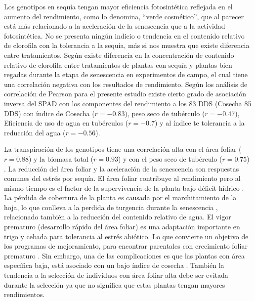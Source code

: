 \documentclass[fleqn,10pt]{Flavio}\usepackage[]{graphicx}\usepackage[]{color}
\begin{document}
Los genotipos en sequ\'ia tengan mayor eficiencia fotosint\'etica reflejada en el aumento del rendimiento, como lo denomina, \citet{Hortensteiner2009} ``verde cosm\'etico'', que al parecer est\'a m\'as relacionado a la aceleraci\'on de la senescencia que a la actividad fotosint\'etica. No se presenta ning\'un indicio o tendencia en el contenido relativo de clorofila con la tolerancia a la sequ\'ia, m\'as si nos muestra que existe diferencia entre tratamientos. Seg\'un \citet{Ramirez2014} existe diferencia en la concentraci\'on de contenido relativo de clorofila entre tratamientos de plantas con sequ\'ia y plantas bien regadas durante la etapa de senescencia en experimentos de campo, el cual tiene una correlaci\'on negativa con los resultados de rendimiento. Seg\'un los an\'alisis de correlaci\'on de Pearson para el presente estudio existe cierto grado de asociaci\'on inversa del SPAD con los componentes del rendimiento a los 83 DDS (Cosecha 85 DDS) con \'indice de Cosecha ($r=-0.83$), peso seco de tub\'erculo ($r=-0.47$), Eficiencia de uso de agua en tub\'erculos ($r=-0.7$) y al \'indice te tolerancia a la reducci\'on del agua ($r=-0.56$).

La transpiraci\'on de los genotipos tiene una correlaci\'on alta con el \'area foliar ($r= 0.88$) y la biomasa total ($r = 0.93$)  y con el peso seco de tub\'erculo ($r = 0.75$) . La reducci\'on del \'area foliar y la aceleraci\'on de la senescencia son respuestas comunes del estr\'es por sequ\'ia. El \'area foliar contribuye al rendimiento pero al mismo tiempo es el factor de la supervivencia de la planta bajo d\'eficit h\'idrico \citep{Ludlow1990}. La p\'erdida de cobertura de la planta es causada por el marchitamiento de la hoja, lo que conlleva a la perdida de turgencia durante la senescencia \citep{Nilsen1996}, relacionado tambi\'en a la reducci\'on del contenido relativo de agua. El vigor prematuro (desarrollo r\'apido del \'area foliar) es una adaptaci\'on importante en trigo y cebada para tolerancia al estr\'es abi\'otico. Lo que convierte un objetivo de los programas de mejoramiento, para encontrar parentales con crecimiento foliar prematuro \citep{Condon2004}. Sin embargo, una de las complicaciones es que las plantas con \'area espec\'ifica baja, est\'a asociado con un bajo \'indice de cosecha \citep{Wright1993}. Tambi\'en la tendencia a la selecci\'on de individuos con \'area foliar alta debe ser evitada durante la selecci\'on ya que no significa que estas plantas tengan mayores rendimientos.
\end{document}
